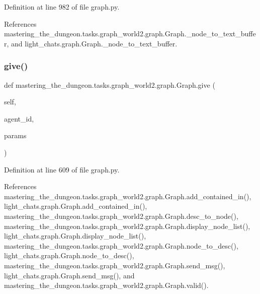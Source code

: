 Definition at line 982 of file graph.\+py.



References mastering\+\_\+the\+\_\+dungeon.\+tasks.\+graph\+\_\+world2.\+graph.\+Graph.\+\_\+node\+\_\+to\+\_\+text\+\_\+buffer, and light\+\_\+chats.\+graph.\+Graph.\+\_\+node\+\_\+to\+\_\+text\+\_\+buffer.

\mbox{\label{classmastering__the__dungeon_1_1tasks_1_1graph__world2_1_1graph_1_1Graph_aee862c606dc898f6f7336f9721b4151d}} 
\subsubsection{\texorpdfstring{give()}{give()}}
{\footnotesize\ttfamily def mastering\+\_\+the\+\_\+dungeon.\+tasks.\+graph\+\_\+world2.\+graph.\+Graph.\+give (\begin{DoxyParamCaption}\item[{}]{self,  }\item[{}]{agent\+\_\+id,  }\item[{}]{params }\end{DoxyParamCaption})}



Definition at line 609 of file graph.\+py.



References mastering\+\_\+the\+\_\+dungeon.\+tasks.\+graph\+\_\+world2.\+graph.\+Graph.\+add\+\_\+contained\+\_\+in(), light\+\_\+chats.\+graph.\+Graph.\+add\+\_\+contained\+\_\+in(), mastering\+\_\+the\+\_\+dungeon.\+tasks.\+graph\+\_\+world2.\+graph.\+Graph.\+desc\+\_\+to\+\_\+node(), mastering\+\_\+the\+\_\+dungeon.\+tasks.\+graph\+\_\+world2.\+graph.\+Graph.\+display\+\_\+node\+\_\+list(), light\+\_\+chats.\+graph.\+Graph.\+display\+\_\+node\+\_\+list(), mastering\+\_\+the\+\_\+dungeon.\+tasks.\+graph\+\_\+world2.\+graph.\+Graph.\+node\+\_\+to\+\_\+desc(), light\+\_\+chats.\+graph.\+Graph.\+node\+\_\+to\+\_\+desc(), mastering\+\_\+the\+\_\+dungeon.\+tasks.\+graph\+\_\+world2.\+graph.\+Graph.\+send\+\_\+msg(), light\+\_\+chats.\+graph.\+Graph.\+send\+\_\+msg(), and mastering\+\_\+the\+\_\+dungeon.\+tasks.\+graph\+\_\+world2.\+graph.\+Graph.\+valid().



